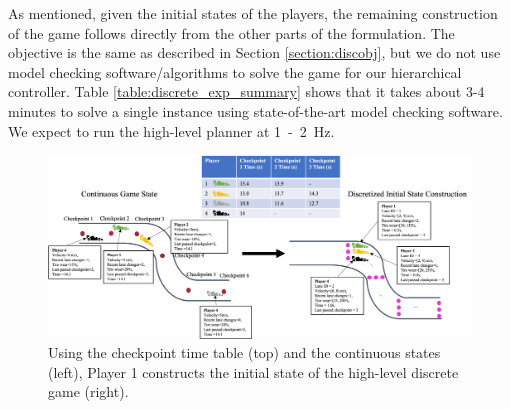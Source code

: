 As mentioned, given the initial states of the players, the remaining construction of the game follows directly from the other parts of the formulation. The objective is the same as described in Section \ref{section:discobj}, but we do not use model checking software/algorithms to solve the game for our hierarchical controller. Table \ref{table:discrete_exp_summary} shows that it takes about 3-4 minutes to solve a single instance using state-of-the-art model checking software. We expect to run the high-level planner at \SI{1}-\SI{2}{\hertz}.

\begin{figure}
  \centering
    \includegraphics[width=\textwidth]{Figures/DiscreteInitialization.png}
  \caption[High-level planner discrete game initialization]{Using the checkpoint time table (top) and the continuous states (left), Player 1 constructs the initial state of the high-level discrete game (right).}
  \label{fig:disc_construct}
\end{figure}

